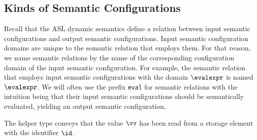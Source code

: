 \subsection{Kinds of Semantic Configurations\label{sec:KindsOfSemanticConfigurations}}

Recall that the ASL dynamic semantics define a relation between input semantic configurations and output semantic configurations.
Input semantic configuration domains are unique to the semantic relation that employs them.
For that reason, we name semantic relations by the name of the corresponding configuration domain of the input semantic configuration.
For example, the semantic relation that employs input semantic configurations with the domain $\evalexpr$
is named $\evalexpr$.
%
We will often use the prefix \texttt{eval} for semantic relations with the intuition being that their input semantic configurations
should be semantically evaluated, yielding an output semantic configuration.

The helper type  conveys that the value $\vv$ has been read
from a storage element with the identifier $\id$.

